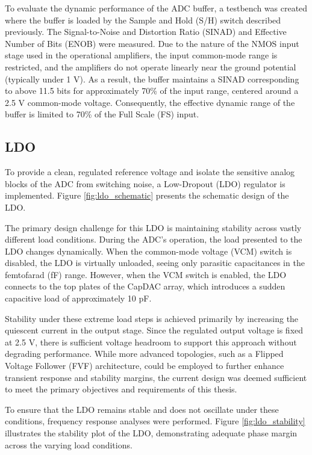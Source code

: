 \documentclass[a4paper,oneside,12pt]{report}
\numberwithin{equation}{chapter}
\begin{document}
To evaluate the dynamic performance of the ADC buffer, a testbench was created where the buffer is loaded by the Sample and Hold (S/H) switch described previously. The Signal-to-Noise and Distortion Ratio (SINAD) and Effective Number of Bits (ENOB) were measured. Due to the nature of the NMOS input stage used in the operational amplifiers, the input common-mode range is restricted, and the amplifiers do not operate linearly near the ground potential (typically under 1 V). As a result, the buffer maintains a SINAD corresponding to above 11.5 bits for approximately 70\% of the input range, centered around a 2.5 V common-mode voltage. Consequently, the effective dynamic range of the buffer is limited to 70\% of the Full Scale (FS) input.

\subsection{LDO}
To provide a clean, regulated reference voltage and isolate the sensitive analog blocks of the ADC from switching noise, a Low-Dropout (LDO) regulator is implemented. 
Figure \ref{fig:ldo_schematic} presents the schematic design of the LDO.

The primary design challenge for this LDO is maintaining stability across vastly different load conditions. During the ADC's operation, the load presented to the LDO changes dynamically. When the common-mode voltage (VCM) switch is disabled, the LDO is virtually unloaded, seeing only parasitic capacitances in the femtofarad (fF) range. However, when the VCM switch is enabled, the LDO connects to the top plates of the CapDAC array, which introduces a sudden capacitive load of approximately 10 pF. 

Stability under these extreme load steps is achieved primarily by increasing the quiescent current in the output stage. Since the regulated output voltage is fixed at 2.5 V, there is sufficient voltage headroom to support this approach without degrading performance. While more advanced topologies, such as a Flipped Voltage Follower (FVF) architecture, could be employed to further enhance transient response and stability margins, the current design was deemed sufficient to meet the primary objectives and requirements of this thesis.

To ensure that the LDO remains stable and does not oscillate under these conditions, frequency response analyses were performed. Figure \ref{fig:ldo_stability} illustrates the stability plot of the LDO, demonstrating adequate phase margin across the varying load conditions.
\end{document}

